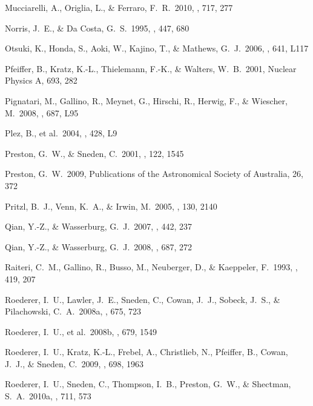 \documentclass{emulateapj}
\begin{document}
\begin{thebibliography}{}
 Mucciarelli, A., 
Origlia, L., \& Ferraro, F.~R.\ 2010, \apj, 717, 277 

 Norris, J.~E., \& 
Da Costa, G.~S.\ 1995, \apj, 447, 680 

 Otsuki, K., Honda, S., 
Aoki, W., Kajino, T., \& Mathews, G.~J.\ 2006, \apjl, 641, L117 

 Pfeiffer, B., Kratz, 
K.-L., Thielemann, F.-K., 
\& Walters, W.~B.\ 2001, Nuclear Physics A, 693, 282 

 Pignatari, M., 
Gallino, R., Meynet, G., Hirschi, R., Herwig, F., 
\& Wiescher, M.\ 2008, \apjl, 687, L95 

 Plez, B., et al.\ 2004, \aap, 428, L9 

 Preston, G.~W., \& Sneden, C.\ 
2001, \aj, 122, 1545 

 Preston, G.~W.\ 2009, 
Publications of the Astronomical Society of Australia, 26, 372 

 Pritzl, B.~J., Venn, 
K.~A., \& Irwin, M.\ 2005, \aj, 130, 2140 

 Qian, Y.-Z., \& 
Wasserburg, G.~J.\ 2007, \physrep, 442, 237 

 Qian, Y.-Z., \& 
Wasserburg, G.~J.\ 2008, \apj, 687, 272 

 Raiteri, C.~M., 
Gallino, R., Busso, M., Neuberger, D., 
\& Kaeppeler, F.\ 1993, \apj, 419, 207 

 Roederer, I.~U., 
Lawler, J.~E., Sneden, C., Cowan, J.~J., Sobeck, J.~S., 
\& Pilachowski, C.~A.\ 2008a, \apj, 675, 723 

 Roederer, I.~U., et 
al.\ 2008b, \apj, 679, 1549 

 Roederer, I.~U., 
Kratz, K.-L., Frebel, A., Christlieb, N., Pfeiffer, B., Cowan, J.~J., 
\& Sneden, C.\ 2009, \apj, 698, 1963 

 Roederer, I.~U., Sneden, C., 
Thompson, I.~B., Preston, G.~W., \& Shectman, S.~A.\ 2010a, \apj, 711, 573


\end{thebibliography}
\end{document}
